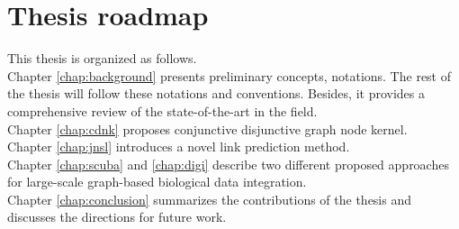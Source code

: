 \section{Thesis roadmap}
This thesis is organized as follows.\\

Chapter \ref{chap:background} presents preliminary concepts, notations. The rest of the thesis will follow these notations and conventions. Besides, it provides a comprehensive review of the state-of-the-art in the field.\\

Chapter \ref{chap:cdnk} proposes conjunctive disjunctive graph node kernel.\\

Chapter \ref{chap:jnsl} introduces a novel link prediction method.\\

Chapter \ref{chap:scuba} and \ref{chap:digi} describe two different proposed approaches for large-scale graph-based biological data integration.\\

Chapter \ref{chap:conclusion} summarizes the contributions of the thesis and discusses the directions for future work.